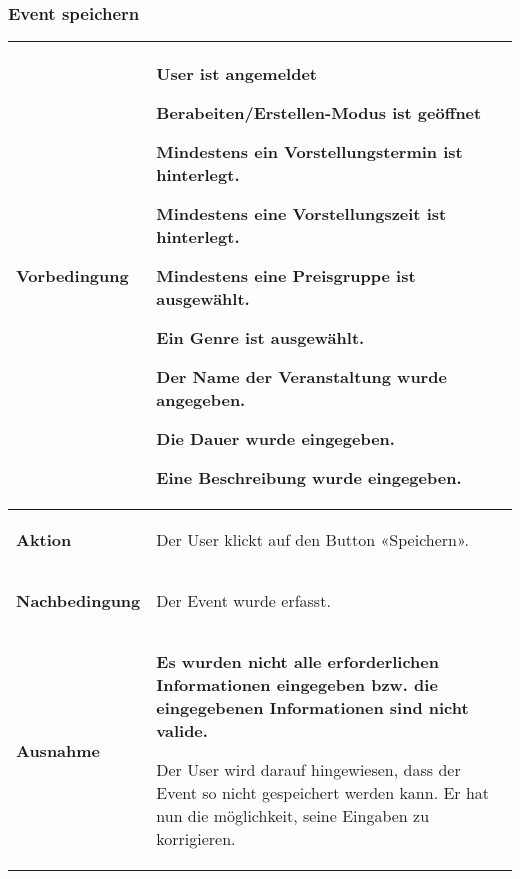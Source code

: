 \documentclass[11pt,a4paper,titlepage,portrait,ngerman]{scrartcl}
\begin{document}
\subsubsection*{Event speichern}
\vspace{2.5mm}
\noindent
\begin{tabular}{|p{}||p{}|}
\hline \rule[-2ex]{0pt}{5.5ex} \textbf{Vorbedingung} & {
	\begin{list}{\textendash}{\vspace{-5mm}}
		\item{User ist angemeldet}
		\item{Berabeiten/Erstellen-Modus ist geöffnet}
		\item{Mindestens ein Vorstellungstermin ist hinterlegt.}
		\item{Mindestens eine Vorstellungszeit ist hinterlegt.}
		\item{Mindestens eine Preisgruppe ist ausgewählt.}
		\item{Ein Genre ist ausgewählt.}
		\item{Der Name der Veranstaltung wurde angegeben.}
		\item{Die Dauer wurde eingegeben.}
		\item{Eine Beschreibung wurde eingegeben.}
	\end{list}
} \\ 
\hline \rule[-2ex]{0pt}{5.5ex} \textbf{Aktion} & {
	\begin{list}{\textendash}{\vspace{-5mm}}
		\item{Der User klickt auf den Button «Speichern».}
	\end{list}
} \\ 
\hline \rule[-2ex]{0pt}{5.5ex} \textbf{Nachbedingung} & {
	\begin{list}{\textendash}{\vspace{-5mm}}
		\item{Der Event wurde erfasst.}
	\end{list}
}  \\
\hline \rule[-2ex]{0pt}{5.5ex} \textbf{Ausnahme} & {
	\begin{list}{\textendash}{\vspace{-5mm}}
		\item{
			\textbf{Es wurden nicht alle erforderlichen Informationen eingegeben bzw. die eingegebenen Informationen sind nicht valide.}
			
			Der User wird darauf hingewiesen, dass der Event so nicht gespeichert werden kann. Er hat nun die möglichkeit, seine Eingaben zu korrigieren.
		}
	\end{list}
}  \\
\hline 
\end{tabular}
\end{document}
